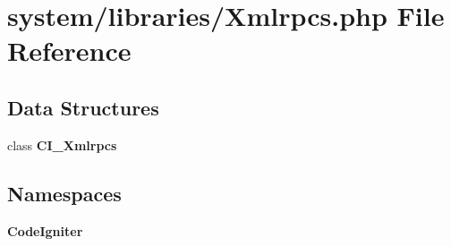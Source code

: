 \section{system/libraries/\-Xmlrpcs.php File Reference}
\label{_xmlrpcs_8php}
\subsection*{Data Structures}
\begin{DoxyCompactItemize}
\item 
class {\bf C\-I\-\_\-\-Xmlrpcs}
\end{DoxyCompactItemize}
\subsection*{Namespaces}
\begin{DoxyCompactItemize}
\item 
{\bf Code\-Igniter}
\end{DoxyCompactItemize}
